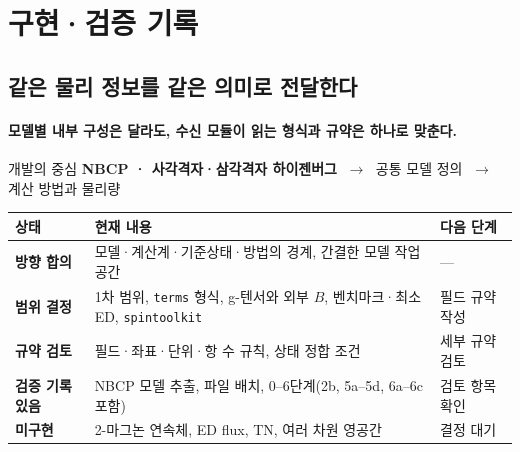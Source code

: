 
\section{구현·검증 기록}

\hypertarget{appendix-a}{}

\subsection{같은 물리 정보를 같은 의미로 전달한다}\label{current-status}
\begingroup%
  \framesubtitle{모델별 내부 구성은 달라도, 수신 모듈이 읽는 형식과 규약은 하나로 맞춘다.}
  \begin{block}{개발의 중심}
    \textbf{NBCP · 사각격자·삼각격자 하이젠버그}
    $\;\longrightarrow\;$ 공통 모델 정의
    $\;\longrightarrow\;$ 계산 방법과 물리량
  \end{block}
  \medskip
  \begin{tabularx}{\textwidth}{@{}p{2.1cm}Yp{2.55cm}@{}}
    \toprule
    상태 & 현재 내용 & 다음 단계 \\
    \midrule
    \textbf{방향 합의} & 모델·계산계·기준상태·방법의 경계, 간결한 모델 작업 공간 & — \\
    \textbf{범위 결정} & 1차 범위, \texttt{terms} 형식, g-텐서와 외부 $B$, 벤치마크·최소 ED, \texttt{spintoolkit} & 필드 규약 작성 \\
    \textbf{규약 검토} & 필드·좌표·단위·항 수 규칙, 상태 정합 조건 & 세부 규약 검토 \\
    \textbf{검증 기록 있음} & NBCP 모델 추출, 파일 배치, 0--6단계(2b, 5a--5d, 6a--6c 포함) & 검토 항목 확인 \\
    \textbf{미구현} & 2-마그논 연속체, ED flux, TN, 여러 차원 영공간 & 결정 대기 \\
    \bottomrule
  \end{tabularx}
\endgroup


